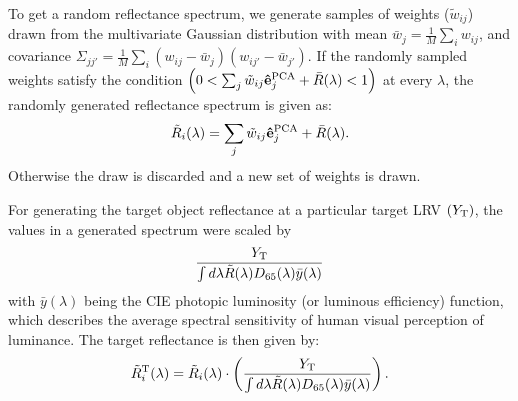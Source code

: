\documentclass[10pt,english]{article}
\begin{document}
To get a random reflectance spectrum, we generate samples of weights ($\tilde{w}_{ij}$) drawn from the multivariate Gaussian 
distribution with mean $\bar{w}_j = \frac{1}{M}\sum_i w_{ij}$, 
and covariance $\Sigma_{jj'} = \frac{1}{M} \sum_i \left(w_{ij} -\bar{w}_j\right)\left(w_{ij'} -\bar{w}_{j'}\right) $. 
If the randomly sampled weights satisfy the condition $\left( 0 < \sum_j \tilde{w}_{ij}{\bf \hat{e}}_j^{\rm PCA} + \bar{R}(\lambda)<1\right) $ at every $\lambda$, the randomly generated reflectance spectrum is given as: 
\begin{align}
\tilde{R}_i(\lambda) =\sum_j \tilde{w}_{ij}{\bf \hat{e}}_j^{\rm PCA} + \bar{R}(\lambda).
\end{align}
Otherwise the draw is discarded and a new set of weights is drawn.

For generating the target object reflectance at a particular target LRV $(Y_{\rm T})$, the values in a generated spectrum were 
scaled by 
\begin{align}
\frac{Y_{\rm T}}{\int d\lambda \tilde{R}(\lambda) D_{65}(\lambda) \bar{y}(\lambda)}
\end{align} 
with $\bar{y}(\lambda)$ being the CIE photopic luminosity (or luminous efficiency) function, which
describes the average spectral sensitivity of human visual 
perception of luminance. The target reflectance is then given by: 
\begin{align}
\tilde{R}^{\rm T}_i(\lambda) =\tilde{R}_i(\lambda) \cdot\left(\frac{Y_{\rm T}}{\int d\lambda \tilde{R}(\lambda) D_{65}(\lambda) \bar{y}(\lambda)}\right).
\end{align}





\end{document}
